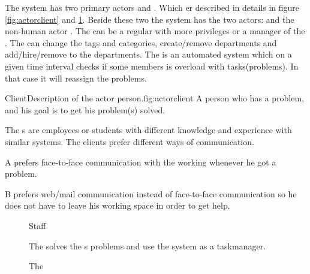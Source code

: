 The system has two primary actors \client{} and \staff. Which er described in details in figure \ref{fig:actorclient} and \ref{fig:actorstaff}. Beside these two the system has the two actors: \sadmin{} and the non-human actor \wmon. The \sadmin{} can be a regular \staff{} with more privileges or a manager of the \staff. The \sadmin{} can change the tags and categories, create/remove departments and add/hire/remove \staff{} to the departments. The \wmon[] is an automated system which on a given time interval checks if some \staff{} members is overload with tasks(problems). In that case it will reassign the problems.

\begin{sadlist}{Client}{Description of the actor person.}{fig:actorclient}
 A person who has a problem, and his goal is to get his problem(s) solved.

 The \client{}s are employees or students with different knowledge and experience with similar systems. The clients prefer different ways of communication.%

 \Client{} A prefers face-to-face communication with the working \staff{} whenever he got a problem. 

\client[c] B prefers web/mail communication instead of face-to-face communication so he does not have to leave his working space in order to get help. 

\end{sadlist}




\begin{figure}[htps]
\label{fig:actorstaff}
\begin{sadlistar}{Staff}

 The \staff{} solves the \client[]s problems and use the system as a taskmanager.  

 The \staff[]
 
 
 \end{sadlistar}
 \caption{}
 \end{figure}